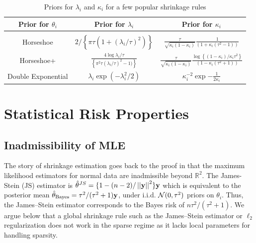 \documentclass[sts,preprint]{imsart}
\begin{document}
\begin{table}[!ht]
\centering
\caption{Priors for $\lambda_i$ and $\kappa_i$ for a few popular shrinkage rules}
\begin{tabular}{ccc}
\hline
Prior for $\theta_i$ & Prior for $\lambda_i$ & Prior for $\kappa_i$ \\ 
\hline \\
Horseshoe & $2/ \left\{ \pi \tau (1 + (\lambda_i/\tau)^2 )\right\}$  & $\frac{\tau}{\sqrt{\kappa_i (1-\kappa_i )}} \frac{1}{(1+\kappa_i (\tau^2 -1 ) )}$ \\[10pt]
Horseshoe+ & $\frac{4\log \lambda_i/\tau}{\left\{{\pi^2 \tau}(\lambda_i/\tau)^2 -1)\right\}}$ &  $\frac{\tau}{\sqrt{\kappa_i (1-\kappa_i )}}\frac{\log \left \{ ( 1 - \kappa_i ) / \kappa_i \tau^2 \right \}}{ (1-\kappa_i (\tau^2 +1 ))}$ \\[10pt]
Double Exponential & $\lambda_i \exp (-\lambda_i^2/2)$ & $\kappa_i^{-2} \exp{-\frac{1}{2\kappa_i}}$ \\
\hline 
\end{tabular}
\end{table}


\section{Statistical Risk Properties}\label{sec:stat-prop}

\subsection{Inadmissibility of MLE} 

The story of shrinkage estimation goes back to the proof in \citet{stein_inadmissibility_1956} that the maximum likelihood estimators for normal data are inadmissible beyond $\mathbb{R}^2$. The James-Stein (JS) estimator is $\hat{\theta}^{JS} = \{1 - (n-2)/\left|\left|{\bf y}\right|\right|^2 \} {\bf y}$ which is equivalent to the posterior mean $\hat{\theta}_{\mathrm{Bayes}} = \tau^2/(\tau^2+1){\bf y}$, under i.i.d. ${\cal N}(0,\tau^2)$ priors on $\theta_i$. Thus, the James--Stein estimator corresponds to the Bayes risk of $n{\tau^2}/({\tau^2+1})$.
We argue below that a global shrinkage rule such as the James--Stein estimator or $\ell_2$ regularization does not work in the sparse regime as it lacks local parameters for handling sparsity.
\end{document}
